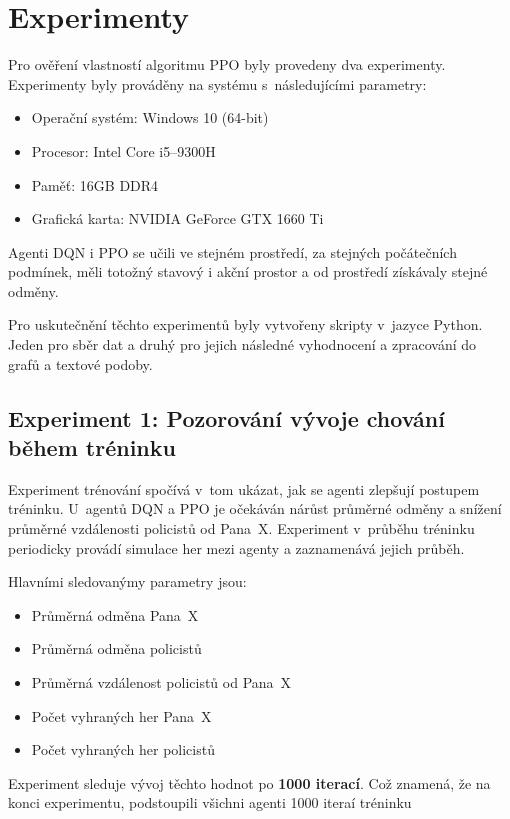 \chapter{Experimenty}
\label{ch:experimenty}

Pro ověření vlastností algoritmu PPO byly provedeny dva experimenty.
Experimenty byly prováděny na systému s~následujícími parametry:

\begin{itemize}
  \item Operační systém: Windows 10 (64-bit)
  \item Procesor: Intel Core i5--9300H
  \item Paměť: 16GB DDR4
  \item Grafická karta: NVIDIA GeForce GTX 1660 Ti
\end{itemize}

Agenti DQN i PPO se učili ve stejném prostředí, za stejných počátečních podmínek, měli totožný stavový i akční prostor a od prostředí získávaly stejné odměny.

Pro uskutečnění těchto experimentů byly vytvořeny skripty v~jazyce Python.
Jeden pro sběr dat a druhý pro jejich následné vyhodnocení a zpracování do grafů a textové podoby.

\section{Experiment 1: Pozorování vývoje chování během tréninku}
\label{sec:experiment-1}

Experiment trénování spočívá v~tom ukázat, jak se agenti zlepšují postupem tréninku.
U~agentů DQN a PPO je očekáván nárůst průměrné odměny a snížení průměrné vzdálenosti policistů od Pana~X\@.
Experiment v~průběhu tréninku periodicky provádí simulace her mezi agenty a zaznamenává jejich průběh.

\bigskip
\noindent Hlavními sledovanýmy parametry jsou:\vspace{-0.5em}
\begin{itemize}
  \item Průměrná odměna Pana~X\vspace{-0.5em}
  \item Průměrná odměna policistů\vspace{-0.5em}
  \item Průměrná vzdálenost policistů od Pana~X\vspace{-0.5em}
  \item Počet vyhraných her Pana~X\vspace{-0.5em}
  \item Počet vyhraných her policistů
\end{itemize}
Experiment sleduje vývoj těchto hodnot po \textbf{1000 iterací}.
Což znamená, že na konci experimentu, podstoupili všichni agenti 1000 iteraí tréninku

